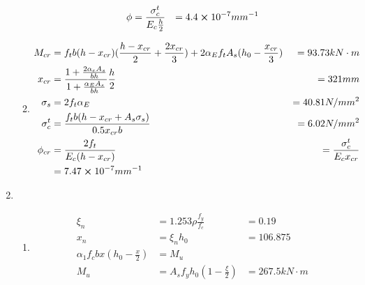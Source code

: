 \documentclass{article}
\begin{document}
\begin{questionList}
\begin{enumerate}
\begin{enumerate}
\begin{align*}
                                    \phi       & =\frac{\sigma_c^t}{E_c\frac{h}{2}} & =4.4\cross10^{-7}mm^{-1}
                              \end{align*}
                              \item\begin{align*}
                                    M_{cr}     & =f_tb(h-x_{cr})(\frac{h-x_{cr}}{2}+\frac{2x_{cr}}{3})+2\alpha_Ef_tA_s(h_0-\frac{x_{cr}}{3}) & =93.73kN\cdot m               \\
                                    x_{cr}     & =\frac{1+\frac{2\alpha_eA_s}{bh}}{1+\frac{\alpha_EA_s}{bh}}\frac{h}{2}                      & =321mm                        \\
                                    \sigma_s   & =2f_t\alpha_E                                                                               & =40.81N/mm^2                  \\
                                    \sigma_c^t & =\frac{f_tb(h-x_{cr}+A_s\sigma_s)}{0.5x_{cr}b}                                              & =6.02N/mm^2                   \\
                                    \phi_{cr}  & =\frac{2f_t}{E_c(h-x_{cr})}                                                                 & =\frac{\sigma_c^t}{E_cx_{cr}} \\
                                               & =7.47\cross10^{-7}mm^{-1}
                              \end{align*}
                  \end{enumerate}
            \item \begin{enumerate}
                        \item \begin{align*}
                                    \xi_n                          & =1.253\rho\frac{f_y}{f_c}   & =0.19                                               \\
                                    x_n                            & =\xi_nh_0                   & =106.875                                            \\
                                    \alpha_1f_cbx(h_0-\frac{x}{2}) & =M_u                                                                              \\
                                    M_u                            & =A_sf_yh_0(1-\frac{\xi}{2}) & =267.5kN\cdot m                                     \\

\end{align*}
\end{enumerate}
\end{enumerate}
\end{questionList}
\end{document}
